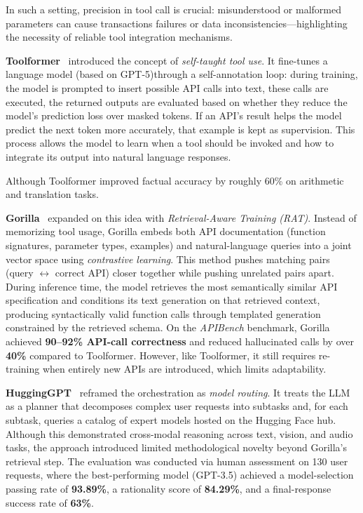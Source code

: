 In such a setting, precision in tool call is crucial: misunderstood or malformed parameters can cause transactions failures or data inconsistencies—highlighting the necessity of reliable tool integration  mechanisms.

\textbf{Toolformer}~\cite{schick2023toolformer} introduced the concept of \emph{self-taught tool use}.  
It fine-tunes a language model (based on \gls{GPT}-5)through a self-annotation loop: during training, the model is prompted to insert possible API calls into text, these calls are executed, the returned outputs are evaluated based on whether they reduce the model's prediction loss over masked tokens.
If an API’s result helps the model predict the next token more accurately, that example is kept as supervision.  
This process allows the model to learn when a tool should be invoked and how to integrate its output into natural language responses.  

Although Toolformer improved factual accuracy by roughly 60\% on arithmetic and translation tasks.

\textbf{Gorilla}~\cite{patil2023gorilla} expanded on this idea with \emph{Retrieval-Aware Training (RAT)}.  
Instead of memorizing tool usage, Gorilla embeds both API documentation (function signatures, parameter types, examples) and natural-language queries into a joint vector space using \emph{contrastive learning}. This method pushes matching pairs (query $\leftrightarrow$ correct API) closer together while pushing unrelated pairs apart.  
During inference time, the model retrieves the most semantically similar API specification and conditions its text generation on that retrieved context, producing syntactically valid function calls through templated generation constrained by the retrieved schema.  
On the \textit{APIBench} benchmark, Gorilla achieved \textbf{90–92\% API-call correctness} and reduced hallucinated calls by over \textbf{40\%} compared to Toolformer.  
However, like Toolformer,  it still requires re-training when entirely new APIs are introduced, which limits adaptability.

\textbf{HuggingGPT}~\cite{shen2023hugginggpt} reframed the orchestration as \emph{model routing}.  
It treats the LLM as a planner that decomposes complex user requests into subtasks and, for each subtask, queries a catalog of expert models hosted on the Hugging Face hub.  
Although this demonstrated cross-modal reasoning across text, vision, and audio tasks, the approach introduced limited methodological novelty beyond Gorilla’s retrieval step.  
The evaluation was conducted via human assessment on 130 user requests, where the best-performing model (\gls{GPT}-3.5) achieved a model-selection passing rate of \textbf{93.89\%}, a rationality score of \textbf{84.29\%}, and a final-response success rate of \textbf{63\%}.




